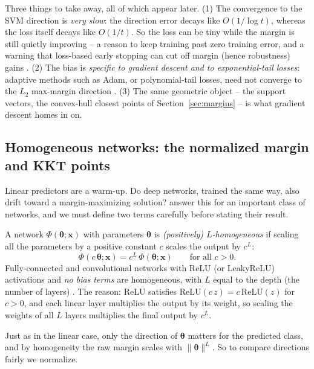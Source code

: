 Three things to take away, all of which appear later. (1) The convergence
to the SVM direction is \emph{very slow}: the direction error decays like
$O(1/\log t)$, whereas the loss itself decays like $O(1/t)$. So the loss
can be tiny while the margin is still quietly improving -- a reason to keep
training past zero training error, and a warning that loss-based early
stopping can cut off margin (hence robustness) gains \citep{soudry2018}.
(2) The bias is \emph{specific to gradient descent and to exponential-tail
losses}: adaptive methods such as Adam, or polynomial-tail losses, need
not converge to the $L_2$ max-margin direction \citep{soudry2018}. (3) The
same geometric object -- the support vectors, the convex-hull closest
points of Section~\ref{sec:margins} -- is what gradient descent homes in
on.

\subsection{Homogeneous networks: the normalized margin and KKT points}

Linear predictors are a warm-up. Do deep networks, trained the same way,
also drift toward a margin-maximizing solution? \citet{lyuli2020} answer
this for an important class of networks, and we must define two terms
carefully before stating their result.

\begin{definition}
\label{def:homog}
A network $\Phi(\boldsymbol\theta;\mathbf{x})$ with parameters
$\boldsymbol\theta$ is \emph{(positively) $L$-homogeneous} if scaling all
the parameters by a positive constant $c$ scales the output by $c^L$:
\[
  \Phi(c\,\boldsymbol\theta;\mathbf{x}) = c^{L}\,\Phi(\boldsymbol\theta;\mathbf{x})
  \qquad\text{for all } c>0.
\]
Fully-connected and convolutional networks with ReLU (or LeakyReLU)
activations and \emph{no bias terms} are homogeneous, with $L$ equal to
the depth (the number of layers) \citep{lyuli2020}. The reason: ReLU
satisfies $\mathrm{ReLU}(c\,z) = c\,\mathrm{ReLU}(z)$ for $c>0$, and each
linear layer multiplies the output by its weight, so scaling the weights
of all $L$ layers multiplies the final output by $c^L$.
\end{definition}

Just as in the linear case, only the direction of $\boldsymbol\theta$
matters for the predicted class, and by homogeneity the raw margin scales
with $\|\boldsymbol\theta\|^L$. So to compare directions fairly we
normalize.

